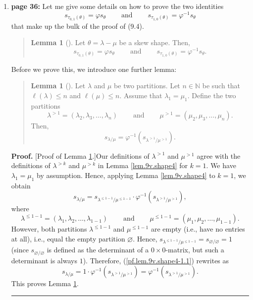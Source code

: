\documentclass[numbers=enddot,12pt,final,onecolumn,notitlepage]{scrartcl}%
\newenvironment{statement}{\begin{quote}}{\end{quote}}
\theoremstyle{definition}
\newtheorem{lem}[theo]{Lemma}
\newenvironment{lemmain}[1][]
{\begin{statement}\begin{lem}[#1]}
{\end{lem}\end{statement}}
\newenvironment{proof}[1][Proof]{\noindent\textbf{#1.} }{\ \rule{0.5em}{0.5em}}
\newenvironment{lemmain}[1][Proof]{\noindent\textbf{#1.} }{\ \rule{0.5em}{0.5em}}
\begin{document}
\begin{enumerate}
\item \textbf{page 36:} Let me give some details on how to prove the two
identities%
\[
s_{\tau_{0,1}\left(  \theta\right)  }=\varphi s_{\theta}%
\ \ \ \ \ \ \ \ \ \ \text{and}\ \ \ \ \ \ \ \ \ \ s_{\tau_{1,0}\left(
\theta\right)  }=\varphi^{-1}s_{\theta}%
\]
that make up the bulk of the proof of (9.4).

\begin{lemmain}
\label{lem.9v.move}Let $\theta=\lambda-\mu$ be a skew shape. Then,%
\[
s_{\tau_{0,1}\left(  \theta\right)  }=\varphi s_{\theta}%
\ \ \ \ \ \ \ \ \ \ \text{and}\ \ \ \ \ \ \ \ \ \ s_{\tau_{1,0}\left(
\theta\right)  }=\varphi^{-1}s_{\theta}.
\]

\end{lemmain}

Before we prove this, we introduce one further lemma:

\begin{lemmain}
\label{lem.9v.shape4-1}Let $\lambda$ and $\mu$ be two partitions. Let
$n\in\mathbb{N}$ be such that $\ell\left(  \lambda\right)  \leq n$ and
$\ell\left(  \mu\right)  \leq n$. Assume that $\lambda_{1}=\mu_{1}$. Define
the two partitions%
\[
\lambda^{>1}=\left(  \lambda_{2},\lambda_{3},\ldots,\lambda_{n}\right)
\ \ \ \ \ \ \ \ \ \ \text{and}\ \ \ \ \ \ \ \ \ \ \mu^{>1}=\left(  \mu_{2}%
,\mu_{3},\ldots,\mu_{n}\right)  .
\]
Then,%
\[
s_{\lambda/\mu}=\varphi^{-1}\left(  s_{\lambda^{>1}/\mu^{>1}}\right)  .
\]

\end{lemmain}

\begin{proof}
[Proof of Lemma \ref{lem.9v.shape4-1}.]Our definitions of $\lambda^{>1}$ and
$\mu^{>1}$ agree with the definitions of $\lambda^{>k}$ and $\mu^{>k}$ in
Lemma \ref{lem.9v.shape4} for $k=1$. We have $\lambda_{1}=\mu_{1}$ by
assumption. Hence, applying Lemma \ref{lem.9v.shape4} to $k=1$, we obtain%
\begin{equation}
s_{\lambda/\mu}=s_{\lambda^{\leq1-1}/\mu^{\leq1-1}}\cdot\varphi^{-1}\left(
s_{\lambda^{>1}/\mu^{>1}}\right)  , \label{pf.lem.9v.shape4-1.1}%
\end{equation}
where
\[
\lambda^{\leq1-1}=\left(  \lambda_{1},\lambda_{2},\ldots,\lambda_{1-1}\right)
\ \ \ \ \ \ \ \ \ \ \text{and}\ \ \ \ \ \ \ \ \ \ \mu^{\leq1-1}=\left(
\mu_{1},\mu_{2},\ldots,\mu_{1-1}\right)  .
\]
However, both partitions $\lambda^{\leq1-1}$ and $\mu^{\leq1-1}$ are empty
(i.e., have no entries at all), i.e., equal the empty partition $\varnothing$.
Hence, $s_{\lambda^{\leq1-1}/\mu^{\leq1-1}}=s_{\varnothing/\varnothing}=1$
(since $s_{\varnothing/\varnothing}$ is defined as the determinant of a
$0\times0$-matrix, but such a determinant is always $1$). Therefore,
(\ref{pf.lem.9v.shape4-1.1}) rewrites as%
\[
s_{\lambda/\mu}=1\cdot\varphi^{-1}\left(  s_{\lambda^{>1}/\mu^{>1}}\right)
=\varphi^{-1}\left(  s_{\lambda^{>1}/\mu^{>1}}\right)  .
\]
This proves Lemma \ref{lem.9v.shape4-1}.
\end{proof}


\end{enumerate}
\end{document}
